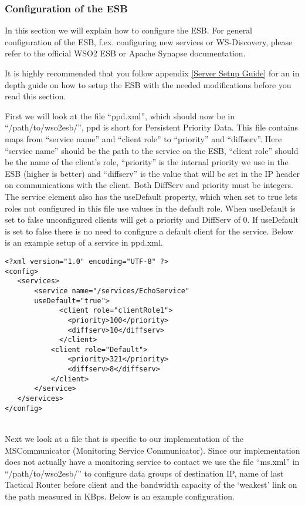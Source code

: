     \subsubsection{Configuration of the ESB}\label{Configuration of the ESB} 
	In this section we will explain how to configure the ESB. For general configuration of the ESB, f.ex. configuring new services or WS-Discovery, please refer to the official WSO2 ESB or Apache Synapse documentation.

	\begin{shaded}
	It is highly recommended that you follow appendix \ref{Server Setup Guide} for an in depth guide on how to setup the ESB with the needed modifications before you read this section.
	\end{shaded}

	First we will look at the file “ppd.xml”, which should now be in “/path/to/wso2esb/”, ppd is short for Persistent Priority Data. This file contains maps from “service name” and “client role” to “priority” and “diffserv”. Here “service name” should be the path to the service on the ESB, “client role” should be the name of the client’s role, “priority” is the internal priority we use in the ESB (higher is better) and “diffserv” is the value that will be set in the IP header on communications with the client. Both DiffServ and priority must be integers.
	The service element also has the useDefault property, which when set to true lets roles not configured in this file use values in the default role. When useDefault is set to false unconfigured clients will get a priority and DiffServ of 0. If useDefault is set to false there is no need to configure a default client for the service.
	Below is an example setup of a service in ppd.xml.\\

\lstset{language=XML}
\begin{lstlisting}[frame=single] %Ok to not have this referenced =)
<?xml version="1.0" encoding="UTF-8" ?>
<config>
   <services>
	   <service name="/services/EchoService" 
	   useDefault="true">
	         <client role="clientRole1">
	           <priority>100</priority>
	           <diffserv>10</diffserv>
	         </client>
	       <client role="Default">
	           <priority>321</priority>
	           <diffserv>8</diffserv>
	       </client>
	   </service>
   </services>
</config>
\end{lstlisting}\\

	Next we look at a file that is specific to our implementation of the MSCommunicator (Monitoring Service Communicator). Since our implementation does not actually have a monitoring service to contact we use the file “ms.xml” in “/path/to/wso2esb/” to configure data groups of destination IP, name of last Tactical Router before client and the bandwidth capacity of the ‘weakest’ link on the path measured in KBps. Below is an example configuration.\\

